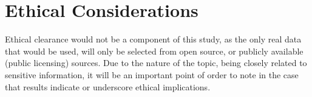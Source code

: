 \section{Ethical Considerations}
Ethical clearance would not be a component of this study, as the only real data that would be used, will only be selected from open source, or publicly available (public licensing) sources. Due to the nature of the topic, being closely related to sensitive information, it will be an important point of order to note in the case that results indicate or underscore ethical implications.
